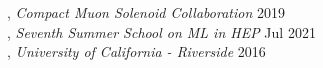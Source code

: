 , \textit{Compact Muon Solenoid Collaboration} \hfill 2019 \\
, \textit{Seventh Summer School on ML in HEP} \hfill Jul 2021 \\
, \textit{University of California - Riverside} \hfill 2016 \\